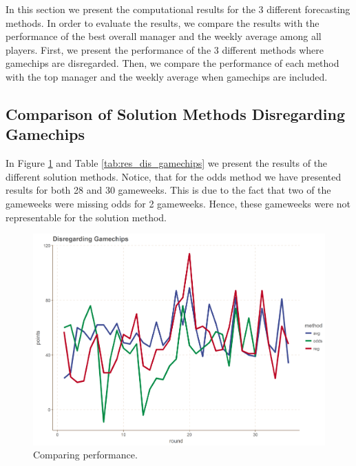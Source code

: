 In this section we present the computational results for the 3 different forecasting methods. In order to evaluate the results, we compare the results with the performance of the best overall manager and the weekly average among all players. First, we present the performance of the 3 different methods where gamechips are disregarded. Then, we compare the performance of each method with the top manager and the weekly average when gamechips are included.  

\newpage

\subsection{Comparison of Solution Methods Disregarding Gamechips}

In Figure \ref{fig:res_comp_dis_gamechips} and Table \ref{tab:res_dis_gamechips} we present the results of the different solution methods. Notice, that for the odds method we have presented results for both 28 and 30 gameweeks. This is due to the fact that two of the gameweeks were missing odds for 2 gameweeks. Hence, these gameweeks were not representable for the solution method.

\begin{figure}[H]
    \centering
    \includegraphics[scale=0.5]{fig/chapter_7/comparison_methods.png}
    \caption{Comparing performance.}
\label{fig:res_comp_dis_gamechips}    
\end{figure}


